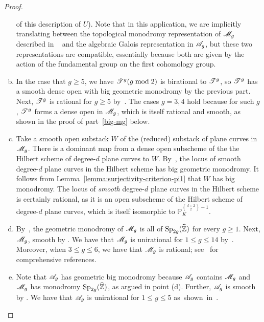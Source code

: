 \begin{proof}
\begin{enumerate}[(a)]
		of this description of $U$).
	       Note that in this application, we are implicitly translating between
the topological monodromy representation of ${\mathscr M_g}$ described in ~\cite[Theorem, p.~2]{bolognesi2016mapping} and the algebraic Galois representation in
${\mathscr A_g}$, but these two representations are compatible, essentially because
both are given by the action of the fundamental group on the first cohomology
group.
\item In the case that $g \geq 5$, we have $\mathscr T^{g}(g \bmod 2)$ is birational to $\mathscr T^{g}$, so $\mathscr T^{g}$
	has a smooth dense open with big geometric monodromy by the previous part.
	Next, $\mathscr T^{g}$ is rational for $g \geq 5$ by~\cite[Theorem, p.~1]{ma2014rationality}.
	The cases $g = 3, 4$ hold because for such $g$, $\mathscr T^{g}$ forms a dense open in ${\mathscr M_g}$, which is itself rational and smooth,
	as shown in the proof of part~\ref{big-mg} below.
\item Take a smooth open substack $W$ of the (reduced)
substack of plane curves in ${\mathscr M_g}$.
There is a dominant map from a dense open subscheme of the the Hilbert scheme of
degree-$d$ plane curves to $W$.
By~\cite[Th\'{e}or\`{e}me 4]{beauville1986groupe}, the locus of smooth degree-$d$ plane curves in the Hilbert scheme has big geometric monodromy. 
It follows from Lemma~\ref{lemma:surjectivity-criterion-pi1}
that $W$ has big monodromy.
The locus of \emph{smooth} degree-$d$ plane curves in the Hilbert scheme
is certainly rational,
       as it is an open subscheme of the Hilbert scheme of degree-$d$ plane curves, which is itself isomorphic to $\mathbb P_K^{\binom{d+2}{2}-1}$.
\item By~\cite[5.12]{deligne1969irreducibility}, the geometric monodromy of ${\mathscr M_g}$ is all of $\operatorname{Sp}_{2g}(\widehat {\mathbb Z})$ for every $g \geq 1$. 	Next, ${\mathscr M_g}$, smooth by \cite[Theorem 5.2]{deligne1969irreducibility}. We have that ${\mathscr M_g}$ is unirational for $1 \leq g \leq 14$ by~\cite{verra2005unirationality}. Moreover, when $3 \leq g \leq 6$, we have that ${\mathscr M_g}$ is rational; see~\cite[p.~2]{casnati2007rationality} for comprehensive references.
\item Note that ${\mathscr A_g}$ has geometric big monodromy because ${\mathscr A_g}$ contains ${\mathscr M_g}$ and ${\mathscr M_g}$ has monodromy $\operatorname{Sp}_{2g}(\widehat {\mathbb Z})$, as argued in point (d).
Further,
		       ${\mathscr A_g}$ is smooth by \cite[Theorem 2.4.1]{oort:finite-group-schemes-local-moduli-for-abelian-varieties-and-lifting-problems}.
	We have that ${\mathscr A_g}$ is unirational for $1 \leq g \leq 5$ \mbox{as shown in~\cite[p.~1]{verra2005unirationality}.}\qedhere
\end{enumerate}
\end{proof}

